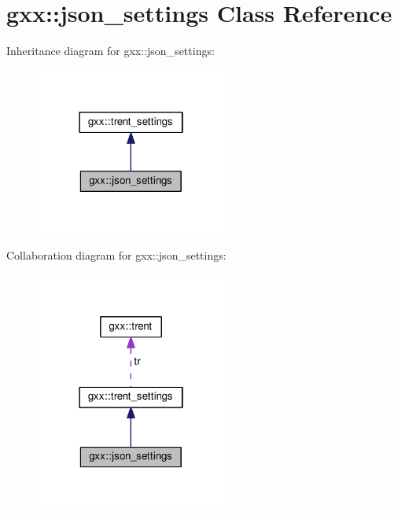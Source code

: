 \hypertarget{classgxx_1_1json__settings}{}\section{gxx\+:\+:json\+\_\+settings Class Reference}
\label{classgxx_1_1json__settings}


Inheritance diagram for gxx\+:\+:json\+\_\+settings\+:
\nopagebreak
\begin{figure}[H]
\begin{center}
\leavevmode
\includegraphics[width=178pt]{classgxx_1_1json__settings__inherit__graph}
\end{center}
\end{figure}


Collaboration diagram for gxx\+:\+:json\+\_\+settings\+:
\nopagebreak
\begin{figure}[H]
\begin{center}
\leavevmode
\includegraphics[width=178pt]{classgxx_1_1json__settings__coll__graph}
\end{center}
\end{figure}
